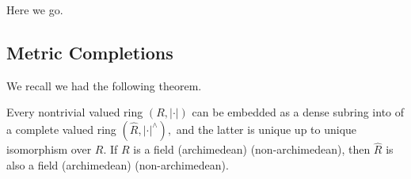 













Here we go.

\subsection{Metric Completions}
We recall we had the following theorem.
\begin{theorem}
	Every nontrivial valued ring $(R,|\cdot|)$ can be embedded as a dense subring into of a complete valued ring $(\hat R,|\cdot|^\wedge),$ and the latter is unique up to unique isomorphism over $R.$ If $R$ is a field (archimedean) (non-archimedean), then $\hat R$ is also a field (archimedean) (non-archimedean).
\end{theorem}
